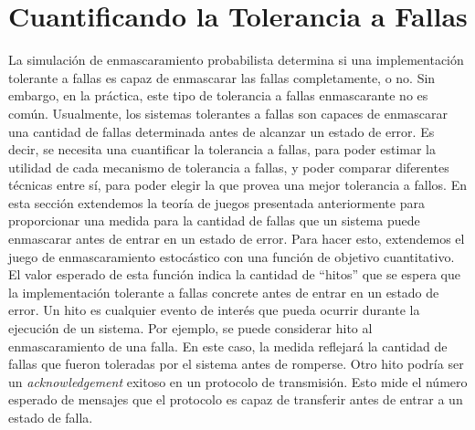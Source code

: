 \section{Cuantificando la Tolerancia a Fallas} \label{sec:almost_sure_prob}

La simulación de enmascaramiento probabilista determina si una implementación tolerante a fallas es capaz de enmascarar las fallas completamente, o no. Sin embargo, en la práctica, este tipo de tolerancia a fallas enmascarante no es común. Usualmente, los sistemas tolerantes a fallas son capaces de enmascarar una cantidad de fallas determinada antes de alcanzar un estado de error. Es decir, se necesita una cuantificar la tolerancia a fallas, para poder estimar la utilidad de cada mecanismo de tolerancia a fallas, y poder comparar diferentes técnicas entre sí, para poder elegir la que provea una mejor tolerancia a fallos.
%
%
En esta sección extendemos la teoría de juegos presentada anteriormente para proporcionar una medida para la cantidad de fallas que un sistema puede enmascarar antes de entrar en un estado de error.
%
Para hacer esto, extendemos el juego de enmascaramiento estocástico con una función de objetivo cuantitativo.
El valor esperado de esta función indica la cantidad de ``hitos'' que se espera que la implementación tolerante a fallas concrete antes de entrar en un estado de error.  Un hito es cualquier evento de interés que pueda ocurrir durante la ejecución de un sistema.  Por ejemplo, se puede considerar hito al enmascaramiento de una falla.
En este caso, la medida reflejará la cantidad de fallas que fueron toleradas por el sistema antes de romperse. Otro hito podría ser un \textit{acknowledgement} exitoso en un protocolo de transmisión. Esto mide el número esperado de mensajes que el protocolo es capaz de transferir antes de entrar a un estado de falla.

